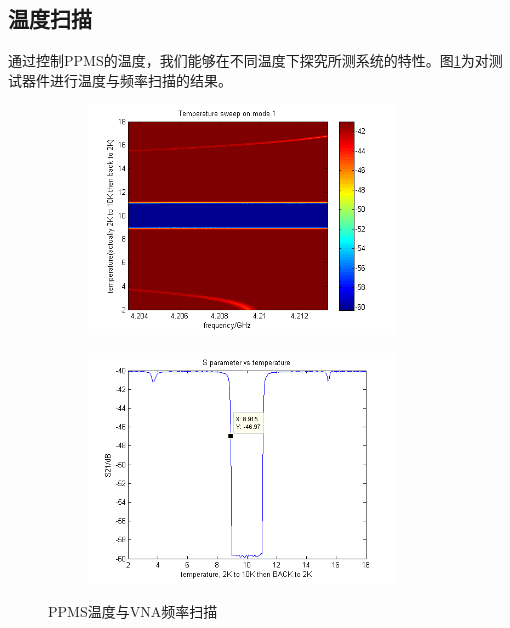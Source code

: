 
                  \subsection{温度扫描} %
                  \label{sub:温度扫描}

                  通过控制PPMS的温度，我们能够在不同温度下探究所测系统的特性。图\ref{fig:PPMSTestTempSweep}为对测试器件进行温度与频率扫描的结果。


\begin{figure}[h]
  \centering%
  \begin{subfigure}{0.4\textwidth}
    \includegraphics[width=3.2in]{figures/meas/Test_TempSweep20170513v2.png}
  \end{subfigure}%
  \hspace*{\fill}
  \begin{subfigure}{0.4\textwidth}
    \includegraphics[width=3.2in]{figures/meas/Test_S_vs_T.png}
  \end{subfigure}
  \caption{PPMS温度与VNA频率扫描}
  \label{fig:PPMSTestTempSweep}
\end{figure}
                 
